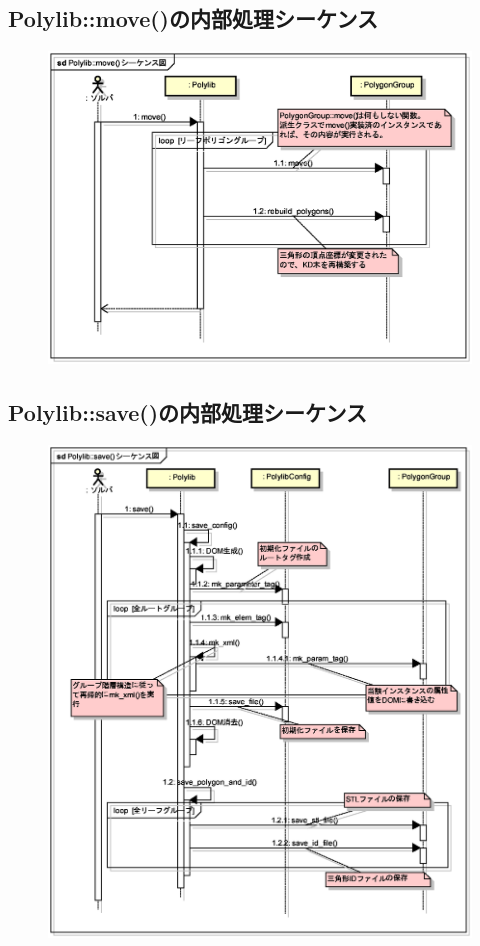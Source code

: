 {%
\subsection{Polylib::move()の内部処理シーケンス}

\begin{figure}[H]
 \centering
 \includegraphics[width=12cm]{clip014.eps}
\end{figure}


\pagebreak
%
\subsection{Polylib::save()の内部処理シーケンス}

\begin{figure}[H]
 \centering
 \includegraphics[width=15cm]{clip015.eps}
\end{figure}


}
